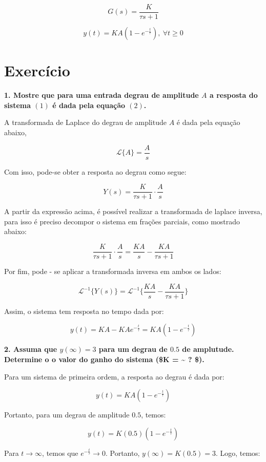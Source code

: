 \documentclass[11pt]{article}
\begin{document}
    \[ G(s) = \frac{K}{\tau s + 1}  \tag{1} \]

\[ y(t) = K A (1 - e^{ - \frac{t}{\tau}}), ~\forall t \geq 0 \tag{2} \]

    \hypertarget{exercuxedcio}{%
\section{Exercício}\label{exercuxedcio}}

\textbf{1. Mostre que para uma entrada degrau de amplitude \(A\) a
resposta do sistema \((1)\) é dada pela equação \((2)\).}

A transformada de Laplace do degrau de amplitude \(A\) é dada pela
equação abaixo,

\[
    \mathcal{L}\{A\} = \dfrac{A}{s}
\]

Com isso, pode-se obter a resposta ao degrau como segue:

\[
    Y(s) = \frac{K}{\tau s + 1} \cdot \frac{A}{s}
\]

A partir da expressão acima, é possível realizar a transformada de
laplace inversa, para isso é preciso decompor o sistema em frações
parciais, como mostrado abaixo:

\[
    \frac{K}{\tau s + 1} \cdot \frac{A}{s} = \frac{KA}{s} - \frac{KA}{\tau s + 1}
\]

Por fim, pode - se aplicar a transformada inversa em ambos os lados:

\[
    \mathcal{L}^{-1}\{Y(s)\} = \mathcal{L}^{-1}\{\frac{KA}{s} - \frac{KA}{\tau s + 1}\}
\]

Assim, o sistema tem resposta no tempo dada por:

\[
    y(t) = KA - KA e^{-\frac{t}{\tau}} = KA(1-e^{-\frac{t}{\tau}})
\]



\textbf{2. Assuma que \(y(\infty) = 3\) para um degrau de \(0.5\) de
amplutude. Determine o o valor do ganho do sistema (\$K =
\textasciitilde{} ? \$).}

Para um sistema de primeira ordem, a resposta ao degrau é dada por:

\[
    y(t)=KA(1-e^{-\frac{t}{\tau}})
\]

Portanto, para um degrau de amplitude \(0.5\), temos:

\[
    y(t) = K(0.5)(1-e^{-\frac{t}{\tau}})
\]

Para \(t \rightarrow \infty\), temos que
\(e^{-\frac{t}{\tau}} \rightarrow 0\). Portanto,
\(y(\infty) = K(0.5) = 3\). Logo, temos:
\end{document}
